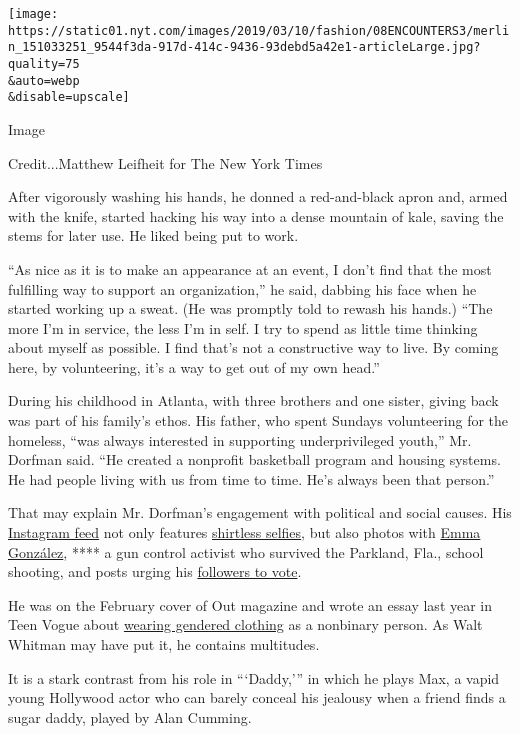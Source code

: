 \texttt{[image: https://static01.nyt.com/images/2019/03/10/fashion/08ENCOUNTERS3/merlin\_151033251\_9544f3da-917d-414c-9436-93debd5a42e1-articleLarge.jpg?quality=75\\\&auto=webp\\\&disable=upscale]}

Image

Credit...Matthew Leifheit for The New York Times

After vigorously washing his hands, he donned a red-and-black apron and,
armed with the knife, started hacking his way into a dense mountain of
kale, saving the stems for later use. He liked being put to work.

``As nice as it is to make an appearance at an event, I don't find that
the most fulfilling way to support an organization,'' he said, dabbing
his face when he started working up a sweat. (He was promptly told to
rewash his hands.) ``The more I'm in service, the less I'm in self. I
try to spend as little time thinking about myself as possible. I find
that's not a constructive way to live. By coming here, by volunteering,
it's a way to get out of my own head.''

During his childhood in Atlanta, with three brothers and one sister,
giving back was part of his family's ethos. His father, who spent
Sundays volunteering for the homeless, ``was always interested in
supporting underprivileged youth,'' Mr. Dorfman said. ``He created a
nonprofit basketball program and housing systems. He had people living
with us from time to time. He's always been that person.''

That may explain Mr. Dorfman's engagement with political and social
causes. His
\href{https://www.instagram.com/tommy.dorfman/?hl=en}{Instagram feed}
not only features
\href{https://www.instagram.com/p/BmUHQ86BD_T/}{shirtless selfies}, but
also photos with \href{https://www.instagram.com/p/BjsJWRpBBQL/}{Emma
González}, **** a gun control activist who survived the Parkland, Fla.,
school shooting, and posts urging his
\href{https://www.instagram.com/p/BpH-245hpNQ/}{followers to vote}.

He was on the February cover of Out magazine and wrote an essay last
year in Teen Vogue about
\href{https://www.teenvogue.com/story/tommy-dorfman-pride-asos-glaad-non-gendered-clothing}{wearing
gendered clothing} as a nonbinary person. As Walt Whitman may have put
it, he contains multitudes.

It is a stark contrast from his role in ```Daddy,''' in which he plays
Max, a vapid young Hollywood actor who can barely conceal his jealousy
when a friend finds a sugar daddy, played by Alan Cumming.

